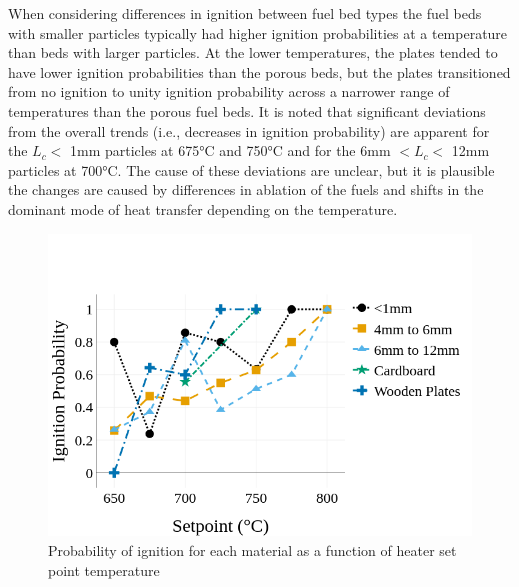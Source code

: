    When considering differences in ignition between fuel bed types the fuel beds with smaller particles typically had higher ignition probabilities at a temperature than beds with larger particles. At the lower temperatures, the plates tended to have lower ignition probabilities than the porous beds, but the plates transitioned from no ignition to unity ignition probability across a narrower range of temperatures than the porous fuel beds. It is noted that significant deviations from the overall trends (i.e., decreases in ignition probability) are apparent for the $L_{c}<$ 1\si{\milli\meter} particles at 675\si{\celsius} and 750\si{\celsius} and for the 6\si{\milli\meter} $<L_{c}<$ 12\si{\milli\meter} particles at 700\si{\celsius}. The cause of these deviations are unclear, but it is plausible the changes are caused by differences in ablation of the fuels and shifts in the dominant mode of heat transfer depending on the temperature.
        \begin{figure}[htpb]
            \centering
            \includegraphics[width=\figureWidthSet]{Figures/setpoint_n5.png}
            \caption{Probability of ignition for each material as a function of heater set point temperature}
            \label{fig:ignProb}
        \end{figure}
